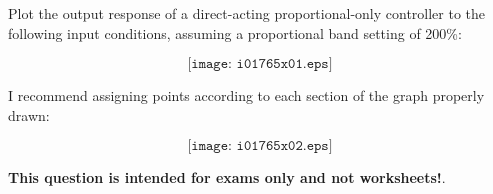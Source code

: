 

Plot the output response of a direct-acting proportional-only controller to the following input conditions, assuming a proportional band setting of 200\%:

$$\texttt{[image: i01765x01.eps]}$$







I recommend assigning points according to each section of the graph properly drawn:

$$\texttt{[image: i01765x02.eps]}$$







{\bf This question is intended for exams only and not worksheets!}.



